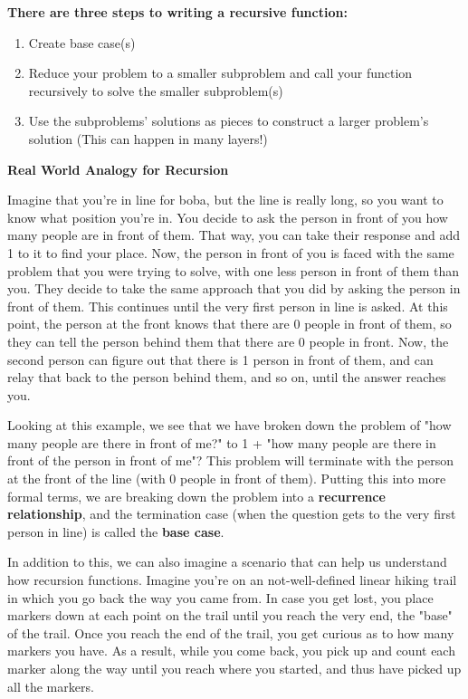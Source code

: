 \begin{blocksection}
\textbf{There are three steps to writing a recursive function:}
\begin{enumerate}
    \item Create base case(s)
    \item Reduce your problem to a smaller subproblem and call your function recursively to solve the smaller subproblem(s)
    \item Use the subproblems' solutions as pieces to construct a larger problem's solution (This can happen in many layers!)
\end{enumerate}

\vspace{3mm}

\textbf{Real World Analogy for Recursion}


Imagine that you're in line for boba, but the line is really long, so you want to know what position you're in. You decide to ask the person in front of you how many people are in front of them. That way, you can take their response and add 1 to it to find your place. Now, the person in front of you is faced with the same problem that you were trying to solve, with one less person in front of them than you. They decide to take the same approach that you did by asking the person in front of them. This continues until the very first person in line is asked. At this point, the person at the front knows that there are 0 people in front of them, so they can tell the person behind them that there are 0 people in front. Now, the second person can figure out that there is 1 person in front of them, and can relay that back to the person behind them, and so on, until the answer reaches you.

Looking at this example, we see that we have broken down the problem of "how many people are there in front of me?" to 1 + "how many people are there in front of the person in front of me"? This problem will terminate with the person at the front of the line (with 0 people in front of them). Putting this into more formal terms, we are breaking down the problem into a \textbf{recurrence relationship}, and the termination case (when the question gets to the very first person in line) is called the \textbf{base case}.

In addition to this, we can also imagine a scenario that can help us understand how recursion functions. Imagine you're on an not-well-defined linear hiking trail in which you go back the way you came from. In case you get lost, you place markers down at each point on the trail until you reach the very end, the "base" of the trail. Once you reach the end of the trail, you get curious as to how many markers you have. As a result, while you come back, you pick up and count each marker along the way until you reach where you started, and thus have picked up all the markers.


\end{blocksection}
